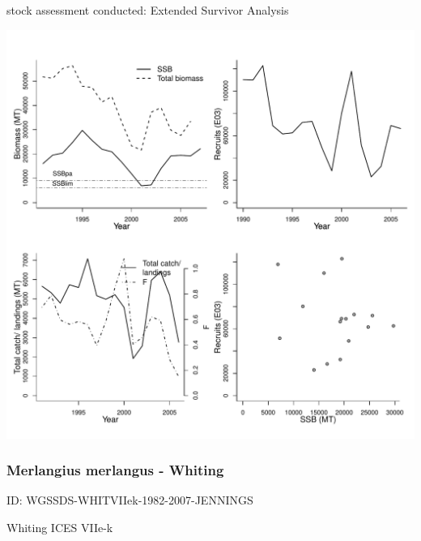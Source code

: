 stock assessment conducted: Extended Survivor Analysis 
\begin{center}
\vspace{-0.2cm}\includegraphics[scale=0.65]{../tex/figures/plot-WGNSSK-HADROCK-1990-2007-JENNINGS.pdf}
\end{center}

\newpage
\subsubsection{Merlangius merlangus - Whiting}
ID: WGSSDS-WHITVIIek-1982-2007-JENNINGS

Whiting ICES VIIe-k 

